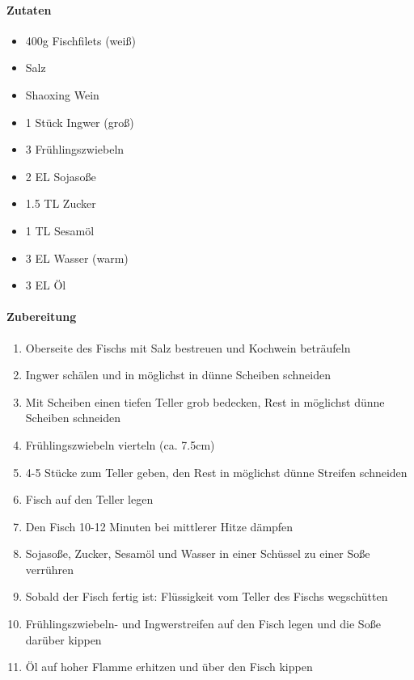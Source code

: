 \clearpage
{}

\paragraph{Zutaten}
\begin{itemize}[noitemsep]
	\item 400g Fischfilets (weiß)
	\item Salz
	\item Shaoxing Wein
	\item 1 Stück Ingwer (groß)
	\item 3 Frühlingszwiebeln
	\item 2 EL Sojasoße 
	\item 1.5 TL Zucker
	\item 1 TL Sesamöl
	\item 3 EL Wasser (warm)
	\item 3 EL Öl 
\end{itemize}


\paragraph{Zubereitung}
\begin{enumerate}[noitemsep]
	\item Oberseite des Fischs mit Salz bestreuen und Kochwein beträufeln
	\item Ingwer schälen und in möglichst in dünne Scheiben schneiden
	\item Mit Scheiben einen tiefen Teller grob bedecken, Rest in möglichst dünne Scheiben schneiden
	\item Frühlingszwiebeln vierteln (ca. 7.5cm) 
	\item 4-5 Stücke zum Teller geben, den Rest in möglichst dünne Streifen schneiden
	\item Fisch auf den Teller legen
	\item Den Fisch 10-12 Minuten bei mittlerer Hitze dämpfen 
	\item Sojasoße, Zucker, Sesamöl und Wasser in einer Schüssel zu einer Soße verrühren
	\item Sobald der Fisch fertig ist: Flüssigkeit vom Teller des Fischs wegschütten
	\item Frühlingszwiebeln- und Ingwerstreifen auf den Fisch legen und die Soße darüber kippen
	\item Öl auf hoher Flamme erhitzen und über den Fisch kippen
\end{enumerate}